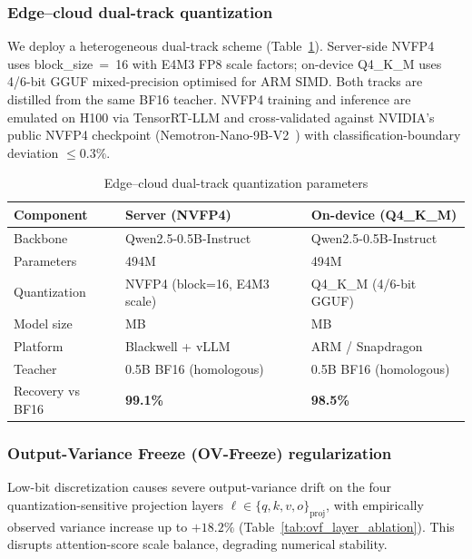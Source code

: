 \documentclass[lettersize,journal]{IEEEtran}
\begin{document}
\subsubsection{Edge--cloud dual-track quantization}

We deploy a heterogeneous dual-track scheme (Table~\ref{tab2}).
Server-side NVFP4~\cite{3} uses block\_size~=~16 with E4M3 FP8 scale
factors; on-device Q4\_K\_M uses 4/6-bit GGUF mixed-precision
optimised for ARM SIMD.  Both tracks are distilled from the same
BF16 teacher.  NVFP4 training and inference are emulated on H100 via
TensorRT-LLM and cross-validated against NVIDIA's public NVFP4
checkpoint (Nemotron-Nano-9B-V2~\cite{3}) with classification-boundary
deviation $\le 0.3\%$.

\begin{table}[htbp]
\caption{Edge--cloud dual-track quantization parameters}
\label{tab2}
\centering
\renewcommand{\arraystretch}{1.15}
\small
\begin{tabular}{l>{\raggedright\arraybackslash}p{2.6cm}%
                  >{\raggedright\arraybackslash}p{2.6cm}}
\toprule
\textbf{Component} & \textbf{Server (NVFP4)} & \textbf{On-device (Q4\_K\_M)} \\
\midrule
Backbone        & Qwen2.5-0.5B-Instruct & Qwen2.5-0.5B-Instruct \\
Parameters      & 494M                  & 494M                   \\
Quantization    & NVFP4 (block=16, E4M3 scale) & Q4\_K\_M (4/6-bit GGUF) \\
Model size      & 248 MB                & 240 MB                 \\
Platform        & Blackwell + vLLM      & ARM / Snapdragon       \\
Teacher         & 0.5B BF16 (homologous)& 0.5B BF16 (homologous) \\
Recovery vs BF16 & \textbf{99.1\%}      & \textbf{98.5\%}        \\
\bottomrule
\end{tabular}
\end{table}

\subsubsection{Output-Variance Freeze (OV-Freeze) regularization}
\label{sec:ovfreeze}

Low-bit discretization causes severe output-variance drift on the
four quantization-sensitive projection layers $\ell \in
\{q,k,v,o\}_{\mathrm{proj}}$, with empirically observed variance
increase up to $+18.2\%$ (Table~\ref{tab:ovf_layer_ablation}).  This
disrupts attention-score scale balance, degrading numerical stability.
\end{document}
